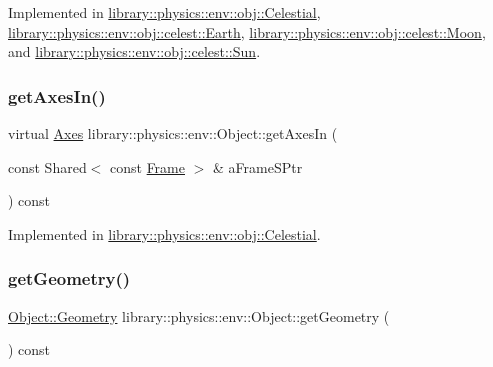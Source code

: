 Implemented in \hyperlink{classlibrary_1_1physics_1_1env_1_1obj_1_1_celestial_aaf8aa41a0ff9336eba62c07e3c27f82d}{library\+::physics\+::env\+::obj\+::\+Celestial}, \hyperlink{classlibrary_1_1physics_1_1env_1_1obj_1_1celest_1_1_earth_aca39bec00a2046a3fcef9bf22be52428}{library\+::physics\+::env\+::obj\+::celest\+::\+Earth}, \hyperlink{classlibrary_1_1physics_1_1env_1_1obj_1_1celest_1_1_moon_a9d922ab338809a6c1052edbe11ce3e60}{library\+::physics\+::env\+::obj\+::celest\+::\+Moon}, and \hyperlink{classlibrary_1_1physics_1_1env_1_1obj_1_1celest_1_1_sun_a79fa2d336dad399c3d933b0f5a2f9427}{library\+::physics\+::env\+::obj\+::celest\+::\+Sun}.

\mbox{\label{classlibrary_1_1physics_1_1env_1_1_object_a6807199a92fd78c10c6327b9ca654f50}} 
\subsubsection{\texorpdfstring{get\+Axes\+In()}{getAxesIn()}}
{\footnotesize\ttfamily virtual \hyperlink{classlibrary_1_1physics_1_1coord_1_1_axes}{Axes} library\+::physics\+::env\+::\+Object\+::get\+Axes\+In (\begin{DoxyParamCaption}\item[{const Shared$<$ const \hyperlink{classlibrary_1_1physics_1_1coord_1_1_frame}{Frame} $>$ \&}]{a\+Frame\+S\+Ptr }\end{DoxyParamCaption}) const\hspace{0.3cm}{\ttfamily [pure virtual]}}



Implemented in \hyperlink{classlibrary_1_1physics_1_1env_1_1obj_1_1_celestial_a51d7ed3c0dcf627fbbcd81f9b190fb6b}{library\+::physics\+::env\+::obj\+::\+Celestial}.

\mbox{\label{classlibrary_1_1physics_1_1env_1_1_object_a504f76c6e6da18b531972e6f26329255}} 
\subsubsection{\texorpdfstring{get\+Geometry()}{getGeometry()}}
{\footnotesize\ttfamily \hyperlink{classlibrary_1_1physics_1_1env_1_1_object_abdf50733c7ad97327fb64edca5670f13}{Object\+::\+Geometry} library\+::physics\+::env\+::\+Object\+::get\+Geometry (\begin{DoxyParamCaption}{ }\end{DoxyParamCaption}) const}

